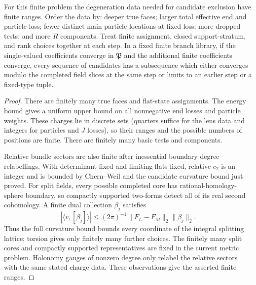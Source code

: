 \begin{lemma}
\label{lem:analysis:finite-data}
For this finite problem the degeneration data needed for candidate
exclusion have finite ranges.
Order the data by: deeper true faces;
larger total effective end and particle loss; fewer distinct main
particle locations at fixed loss; more dropped tests; and more $R$
components.  Treat finite assignment, closed support-stratum, and rank
choices together at each step.  In a fixed finite branch library, if the single-valued
coefficients converge in $\mathfrak P$ and the additional finite
coefficients converge, every sequence of candidates has a subsequence
which either converges modulo the completed field slices at the same
step or limits to an earlier step or a fixed-type tuple.
\end{lemma}
\begin{proof}
There are finitely many true faces and flat-state assignments.  The
energy bound gives a uniform upper bound on all nonnegative end
losses and particle weights.  These charges lie in discrete sets
(quarters suffice for the lens data and integers for particles and
$J$ losses), so their ranges and the possible numbers of positions
are finite.  There are finitely many basic tests and components.

Relative bundle sectors are also finite after inessential boundary
degree relabellings.  With determinant fixed and limiting flats fixed,
relative $c_2$ is an integer and is bounded by Chern--Weil and the
candidate curvature bound just proved.  For split fields, every possible
completed core has rational-homology-sphere boundary, so compactly
supported two-forms detect all of its real second cohomology.  A finite
dual collection $\beta_j$ satisfies
\[
 |\langle v,[\beta_j]\rangle|
 \leq (2\pi)^{-1}\|F_L-F_M\|_2\|\beta_j\|_2.
\]
Thus the full curvature bound bounds every coordinate of the integral
splitting lattice; torsion gives only finitely many further choices.
The finitely many split cores and compactly supported representatives
are fixed in the current metric problem.  Holonomy gauges of nonzero
degree only relabel the relative sectors with the same stated charge
data.  These observations give the asserted finite ranges.


\end{proof}
